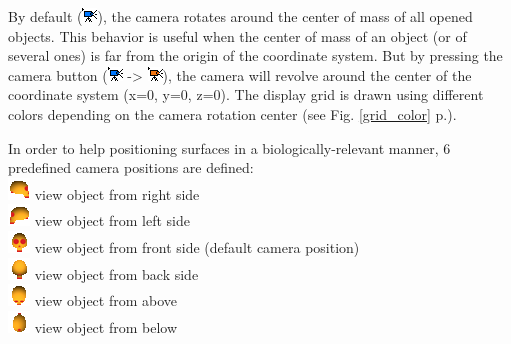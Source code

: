 \documentclass[12pt, a4paper]{book}
\begin{document}
By default (\includegraphics[scale=0.7]{../images/06/camera/move_cam2.png}), the camera rotates around the center of mass of all opened objects. This behavior is useful when the center of mass of an object (or of several ones) is far from the origin of the coordinate system. But by pressing the camera button (\includegraphics[scale=0.7]{../images/06/camera/move_cam2.png} -> \includegraphics[scale=0.7]{../images/06/camera/move_cam.png}), the camera will revolve around the center of the coordinate system (x=0, y=0, z=0).  The display grid is drawn using different colors depending on the camera rotation center (see Fig. \ref{grid_color} p.\pageref{grid_color}).


In order to help positioning surfaces in a biologically-relevant manner, 6 predefined camera positions are defined:\\
\includegraphics[scale=0.7]{../images/06/camera/camera_right.png} view object from right side \\
\includegraphics[scale=0.7]{../images/06/camera/camera_left.png} view object from left side\\
\includegraphics[scale=0.7]{../images/06/camera/camera_front.png} view object from front side (default camera position)\\
\includegraphics[scale=0.7]{../images/06/camera/camera_back.png} view object from back side\\
\includegraphics[scale=0.7]{../images/06/camera/camera_above.png} view object from above\\
\includegraphics[scale=0.7]{../images/06/camera/camera_below.png} view object from below\\
\end{document}
